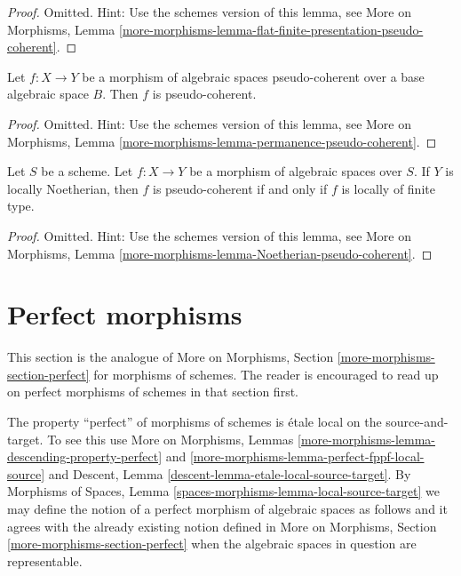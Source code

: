 \begin{proof}
Omitted. Hint: Use the schemes version of this lemma, see
More on Morphisms,
Lemma \ref{more-morphisms-lemma-flat-finite-presentation-pseudo-coherent}.
\end{proof}

\begin{lemma}
\label{lemma-permanence-pseudo-coherent}
Let $f : X \to Y$ be a morphism of algebraic spaces pseudo-coherent
over a base algebraic space $B$. Then $f$ is pseudo-coherent.
\end{lemma}

\begin{proof}
Omitted. Hint: Use the schemes version of this lemma, see
More on Morphisms,
Lemma \ref{more-morphisms-lemma-permanence-pseudo-coherent}.
\end{proof}

\begin{lemma}
\label{lemma-Noetherian-pseudo-coherent}
Let $S$ be a scheme. Let $f : X \to Y$ be a morphism of algebraic spaces
over $S$. If $Y$ is locally Noetherian, then $f$ is pseudo-coherent if
and only if $f$ is locally of finite type.
\end{lemma}

\begin{proof}
Omitted. Hint: Use the schemes version of this lemma, see
More on Morphisms,
Lemma \ref{more-morphisms-lemma-Noetherian-pseudo-coherent}.
\end{proof}








\section{Perfect morphisms}
\label{section-perfect}

\noindent
This section is the analogue of
More on Morphisms, Section \ref{more-morphisms-section-perfect}
for morphisms of schemes. The reader is encouraged to read up
on perfect morphisms of schemes in that section first.

\medskip\noindent
The property ``perfect'' of morphisms of schemes is
\'etale local on the source-and-target. To see this use
More on Morphisms,
Lemmas \ref{more-morphisms-lemma-descending-property-perfect} and
\ref{more-morphisms-lemma-perfect-fppf-local-source}
and
Descent, Lemma \ref{descent-lemma-etale-local-source-target}.
By
Morphisms of Spaces,
Lemma \ref{spaces-morphisms-lemma-local-source-target}
we may define the notion of a perfect morphism of algebraic spaces as
follows and it agrees with the already existing notion defined in
More on Morphisms, Section \ref{more-morphisms-section-perfect}
when the algebraic spaces in question are representable.

